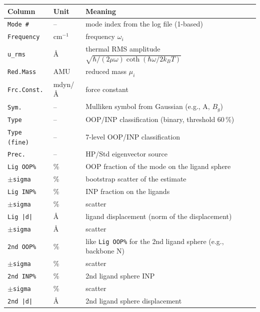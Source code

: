 \documentclass[11pt,a4paper,twoside]{article}
\providecommand{\angstrom}{\text{\AA}}    %
\theoremstyle{remark}
\begin{document}
\begin{center}
\small
\begin{tabular}{p{3.6cm}p{1.4cm}p{8.4cm}}
\toprule
\textbf{Column} & \textbf{Unit} & \textbf{Meaning} \\
\midrule
\texttt{Mode \#}         & --       & mode index from the log file (1-based) \\
\texttt{Frequency}       & cm$^{-1}$ & frequency $\omega_i$ \\
\texttt{u\_rms}          & $\angstrom$ & thermal RMS amplitude
                                       $\sqrt{\hbar/(2\mu\omega)\coth(\hbar\omega/2k_BT)}$ \\
\texttt{Red.Mass}        & AMU      & reduced mass $\mu_i$ \\
\texttt{Frc.Const.}      & mdyn/$\angstrom$ & force constant \\
\texttt{Sym.}            & --       & Mulliken symbol from Gaussian (e.g., A, $B_g$) \\
\texttt{Type}            & --       & OOP/INP classification (binary, threshold 60\,\%) \\
\texttt{Type (fine)}     & --       & 7-level OOP/INP classification \\
\texttt{Prec.}           & --       & HP/Std eigenvector source \\
\texttt{Lig OOP\%}       & \%       & OOP fraction of the mode on the ligand sphere \\
\texttt{$\pm$sigma}      & \%       & bootstrap scatter of the estimate \\
\texttt{Lig INP\%}       & \%       & INP fraction on the ligands \\
\texttt{$\pm$sigma}      & \%       & scatter \\
\texttt{Lig |d|}         & $\angstrom$ & ligand displacement (norm of the displacement) \\
\texttt{$\pm$sigma}      & $\angstrom$ & scatter \\
\texttt{2nd OOP\%}       & \%       & like \texttt{Lig OOP\%} for the 2nd ligand sphere
                                       (e.g., backbone N) \\
\texttt{$\pm$sigma}      & \%       & scatter \\
\texttt{2nd INP\%}       & \%       & 2nd ligand sphere INP \\
\texttt{$\pm$sigma}      & \%       & scatter \\
\texttt{2nd |d|}         & $\angstrom$ & 2nd ligand sphere displacement \\
\bottomrule
\end{tabular}
\end{center}
\end{document}
